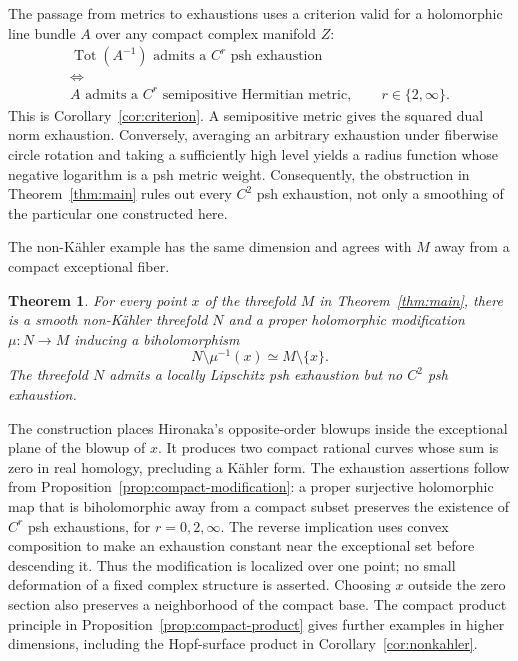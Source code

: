 \documentclass[11pt]{amsart}
\newtheorem{theorem}{Theorem}[section]
\theoremstyle{definition}
\theoremstyle{remark}
\numberwithin{equation}{section}
\newcommand{\Tot}{\operatorname{Tot}}
\begin{document}
The passage from metrics to exhaustions uses a criterion valid for a
holomorphic line bundle $A$ over any compact complex manifold $Z$:
\[
\begin{gathered}
 \Tot(A^{-1})\text{ admits a }C^r\text{ psh exhaustion}\\
 \Longleftrightarrow\\[-2pt]
 A\text{ admits a }C^r\text{ semipositive Hermitian metric},
 \qquad r\in\{2,\infty\}.
\end{gathered}
\]
This is Corollary~\ref{cor:criterion}. A semipositive metric gives the
squared dual norm exhaustion. Conversely, averaging an arbitrary
exhaustion under fiberwise circle rotation and taking a sufficiently
high level yields a radius function whose negative logarithm is a psh
metric weight. Consequently, the obstruction in Theorem~\ref{thm:main}
rules out every $C^2$ psh exhaustion, not only a smoothing of the
particular one constructed here.

The non-K\"ahler example has the same dimension and agrees with $M$
away from a compact exceptional fiber.

\begin{theorem}\label{thm:nonkahler-threefold}
For every point $x$ of the threefold $M$ in Theorem~\ref{thm:main}, there
is a smooth non-K\"ahler threefold $N$ and a proper holomorphic
modification $\mu:N\to M$ inducing a biholomorphism
\[
 N\setminus\mu^{-1}(x)\simeq M\setminus\{x\}.
\]
The threefold $N$ admits a locally Lipschitz psh exhaustion but no
$C^2$ psh exhaustion.
\end{theorem}

The construction places Hironaka's opposite-order blowups inside the
exceptional plane of the blowup of $x$. It produces two compact rational
curves whose sum is zero in real homology, precluding a K\"ahler form.
The exhaustion assertions follow from Proposition~\ref{prop:compact-modification}:
a proper surjective holomorphic map that is biholomorphic away from a compact
subset preserves the existence of $C^r$ psh exhaustions, for
$r=0,2,\infty$. The reverse implication uses convex composition to
make an exhaustion constant near the exceptional set before descending
it. Thus the modification is localized over one point; no small
deformation of a fixed complex structure is asserted. Choosing $x$
outside the zero section also preserves a neighborhood of the compact
base. The compact product principle in Proposition~\ref{prop:compact-product}
gives further examples in higher dimensions, including the Hopf-surface
product in Corollary~\ref{cor:nonkahler}.
\end{document}
